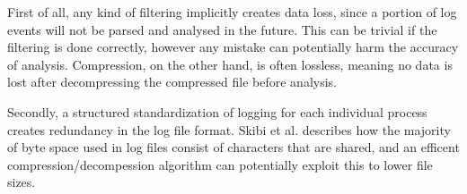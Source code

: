\documentclass[runningheads]{llncs}
\begin{document}
First of all, any kind of filtering implicitly creates data loss, since a portion of log events will not be parsed and analysed in the future. This can be trivial if the filtering is done correctly, however any mistake can potentially harm the accuracy of analysis\cite{losslessCompression}. Compression, on the other hand, is often lossless, meaning no data is lost after decompressing the compressed file before analysis. 


Secondly, a structured standardization of logging for each individual process creates redundancy in the log file format. Skibi et al. \cite{fastCompression} describes how the majority of byte space used in log files consist of characters that are shared, and an efficent compression/decompession algorithm can potentially exploit this to lower file sizes. 









%
%
%
%
%


%




\end{document}
